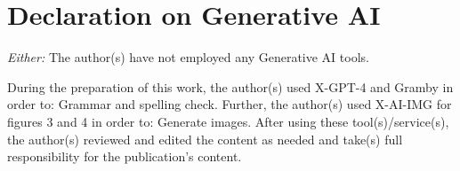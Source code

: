 \section*{Declaration on Generative AI}
  {\em Either:}\newline
  The author(s) have not employed any Generative AI tools.
  \newline
  
 During the preparation of this work, the author(s) used X-GPT-4 and Gramby in order to: Grammar and spelling check. Further, the author(s) used X-AI-IMG for figures 3 and 4 in order to: Generate images. After using these tool(s)/service(s), the author(s) reviewed and edited the content as needed and take(s) full responsibility for the publication’s content. 
